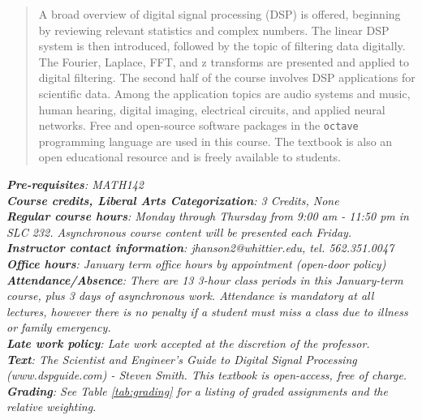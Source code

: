 \documentclass[10pt]{article}
\begin{document}
\maketitle

\begin{abstract}
A broad overview of digital signal processing (DSP) is offered, beginning by reviewing relevant statistics and complex numbers. The linear DSP system is then introduced, followed by the topic of filtering data digitally. The Fourier, Laplace, FFT, and z transforms are presented and applied to digital filtering. The second half of the course involves DSP applications for scientific data. Among the application topics are audio systems and music, human hearing, digital imaging, electrical circuits, and applied neural networks. Free and open-source software packages in the \verb+octave+ programming language are used in this course.  The textbook is also an open educational resource and is freely available to students.
\end{abstract}
\noindent
\textit{\textbf{Pre-requisites}: MATH142} \\
\textit{\textbf{Course credits, Liberal Arts Categorization}: 3 Credits, None} \\
\textit{\textbf{Regular course hours}: Monday through Thursday from 9:00 am - 11:50 pm in SLC 232.  Asynchronous course content will be presented each Friday.} \\
\textit{\textbf{Instructor contact information}: jhanson2@whittier.edu, tel. 562.351.0047} \\
\textit{\textbf{Office hours}: January term office hours by appointment (open-door policy)} \\
\textit{\textbf{Attendance/Absence}: There are 13 3-hour class periods in this January-term course, plus 3 days of asynchronous work.  Attendance is mandatory at all lectures, however there is no penalty if a student must miss a class due to illness or family emergency.} \\
\textit{\textbf{Late work policy}: Late work accepted at the discretion of the professor.} \\
\textit{\textbf{Text}: The Scientist and Engineer's Guide to Digital Signal Processing (www.dspguide.com) - Steven Smith.  This textbook is open-access, free of charge.} \\
\textit{\textbf{Grading}:  See Table \ref{tab:grading} for a listing of graded assignments and the relative weighting.}
\end{document}
